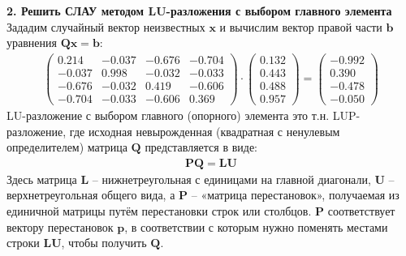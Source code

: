 \documentclass[a4paper]{article}
\begin{document}
{\Large{\textbf{2. Решить СЛАУ методом LU-разложения с выбором главного элемента}}}\\
Зададим случайный вектор неизвестных $\mathbf{x}$ и вычислим вектор правой части $\mathbf{b}$ уравнения $\mathbf{Qx}=\mathbf{b}$:
\begin{align}
    \begin{pmatrix}
        0.214 & -0.037 &  -0.676 &  -0.704 \\
        -0.037 &   0.998 & -0.032 & -0.033 \\
        -0.676 & -0.032  &  0.419 &  -0.606 \\
        -0.704 & -0.033  & -0.606  &   0.369
    \end{pmatrix} \cdot
    \begin{pmatrix}
        0.132 \\
        0.443 \\
        0.488 \\
        0.957
    \end{pmatrix} =
    \begin{pmatrix}
        -0.992 \\
         0.390 \\
        -0.478 \\
        -0.050
    \end{pmatrix}
\end{align}
LU-разложение с выбором главного (опорного) элемента это т.н. LUP-разложение, где исходная невырожденная (квадратная с ненулевым определителем) матрица $\mathbf{Q}$ представляется в виде:
\begin{align}
    \mathbf{PQ} = \mathbf{LU}
\end{align}
Здесь матрица $\mathbf{L}$ -- нижнетреугольная с единицами на главной диагонали, $\mathbf{U}$ -- верхнетреугольная общего вида, а $\mathbf{P}$ -- «матрица перестановок», получаемая из единичной матрицы путём перестановки строк или столбцов. $\mathbf{P}$ соответствует вектору перестановок $\mathbf{p}$, в соответствии с которым нужно поменять местами строки $\mathbf{LU}$, чтобы получить $\mathbf{Q}$.\\
\end{document}
